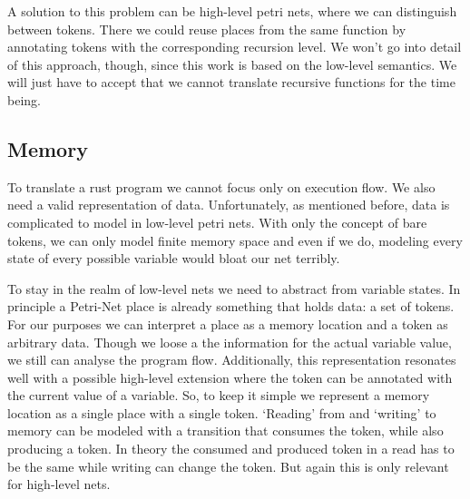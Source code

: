 A solution to this problem can be high-level petri nets, where we can distinguish between tokens.
There we could reuse places from the same function by annotating tokens with the corresponding recursion level.
We won't go into detail of this approach, though, since this work is based on the low-level semantics.
We will just have to accept that we cannot translate recursive functions for the time being.

\subsection{Memory}
To translate a rust program we cannot focus only on execution flow.
We also need a valid representation of data.
Unfortunately, as mentioned before, data is complicated to model in low-level petri nets.
With only the concept of bare tokens, we can only model finite memory space and even if we do, modeling every state of every possible variable would bloat our net terribly.

To stay in the realm of low-level nets we need to abstract from variable states.
In principle a Petri-Net place is already something that holds data: a set of tokens.
For our purposes we can interpret a place as a memory location and a token as arbitrary data.
Though we loose a the information for the actual variable value, we still can analyse the program flow.
Additionally, this representation resonates well with a possible high-level extension where the token can be annotated with the current value of a variable.
So, to keep it simple we represent a memory location as a single place with a single token.
`Reading' from and `writing' to memory can be modeled with a transition that consumes the token, while also producing a token.
In theory the consumed and produced token in a read has to be the same while writing can change the token.
But again this is only relevant for high-level nets.

